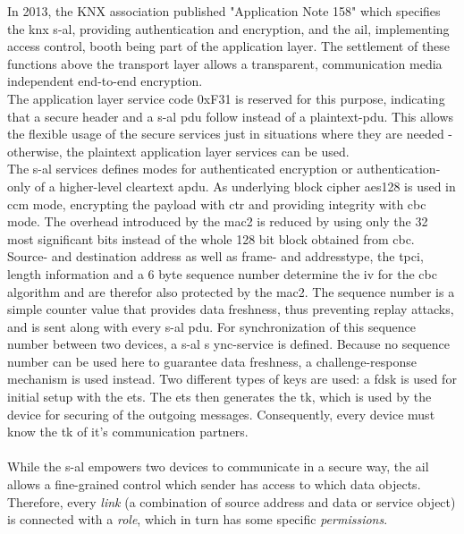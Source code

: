 In 2013, the KNX association published "Application Note 158" \cite{knx_data_sec} which specifies the \gls{knx} \gls{s-al}, providing
authentication and encryption, and the \gls{ail}, implementing access control, booth being part of the application layer.
The settlement of these functions above the transport layer allows a transparent, communication media independent end-to-end encryption.
\\
The application layer service code 0xF31 is reserved for this purpose, indicating that a secure header and a \gls{s-al} \gls{pdu} 
follow instead of a plaintext-\gls{pdu}. This allows the flexible usage of the secure services just in situations where they are needed - otherwise, the plaintext application
layer services can be used.
\\
The \gls{s-al} services defines modes for authenticated encryption or authentication-only of a higher-level cleartext \gls{apdu}. As underlying block cipher
\gls{aes}128 is used in \gls{ccm} mode, encrypting the payload with \gls{ctr} and providing integrity with \gls{cbc} mode. The overhead introduced by the 
\gls{mac2} is reduced by 
using only the 32 most significant bits instead of the whole 128 bit block obtained from \gls{cbc}. Source- and destination address as well as
frame- and addresstype, the \gls{tpci}, length information and a 6 byte sequence number determine the \gls{iv} for the \gls{cbc} algorithm and are therefor also protected by the \gls{mac2}.
The sequence number is a simple counter value that provides data freshness, thus preventing replay attacks, and is sent along with every \gls{s-al} \gls{pdu}.
For synchronization of this sequence number between two devices, a \gls{s-al} s	ync-service is defined. Because no sequence number can be used here to guarantee
data freshness, a challenge-response mechanism is used instead.
Two different types of keys are used: a \gls{fdsk} is used for initial setup with the \gls{ets}. The \gls{ets} then generates the \gls{tk}, which is used by the
device for securing of the outgoing messages. Consequently, every device must know the \gls{tk} of it's communication partners.
\\
\\
While the \gls{s-al} empowers two devices to communicate in a secure way, the \gls{ail} allows a fine-grained control which sender has access to which
data objects. Therefore, every \textit{link} (a combination of source address and data or service object) is connected with a \textit{role}, which in turn
has some specific \textit{permissions}. 

